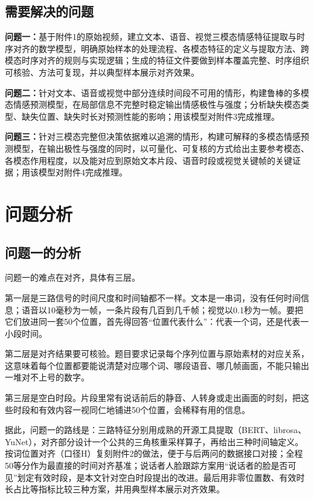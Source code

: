 \subsection{需要解决的问题}

\textbf{问题一：}基于附件1的原始视频，建立文本、语音、视觉三模态情感特征提取与时序对齐的数学模型，明确原始样本的处理流程、各模态特征的定义与提取方法、跨模态时序对齐的规则与实现逻辑；生成的特征文件要做到样本覆盖完整、时序组织可核验、方法可复现，并以典型样本展示对齐效果。

\textbf{问题二：}针对文本、语音或视觉中部分连续时间段不可用的情形，构建鲁棒的多模态情感预测模型，在局部信息不完整时稳定输出情感极性与强度；分析缺失模态类型、缺失位置、缺失时长对预测性能的影响；用该模型对附件3完成推理。

\textbf{问题三：}针对三模态完整但决策依据难以追溯的情形，构建可解释的多模态情感预测模型，在输出极性与强度的同时，以可量化、可复核的方式给出主要参考模态、各模态作用程度，以及能对应到原始文本片段、语音时段或视觉关键帧的关键证据；用该模型对附件4完成推理。

\section{问题分析}

\subsection{问题一的分析}

问题一的难点在对齐，具体有三层。

第一层是三路信号的时间尺度和时间轴都不一样。文本是一串词，没有任何时间信息；语音以10毫秒为一帧，一条片段有几百到几千帧；视觉以0.1秒为一帧。要把它们放进同一套50个位置，首先得回答“位置代表什么”：代表一个词，还是代表一小段时间。

第二层是对齐结果要可核验。题目要求记录每个序列位置与原始素材的对应关系，这意味着每个位置都要能说清楚对应哪个词、哪段语音、哪几帧画面，不能只输出一堆对不上号的数字。

第三层是空白时段。片段里常有说话前后的静音、人转身或走出画面的时刻，把这些时段和有效内容一视同仁地铺进50个位置，会稀释有用的信息。

据此，问题一的路线是：三路特征分别用成熟的开源工具提取（BERT、librosa、YuNet），对齐部分设计一个公共的三角核重采样算子，再给出三种时间轴定义。按词位置对齐（口径H）复刻附件2的做法，便于与后两问的数据接口对接；全程50等分作为最直接的时间对齐基准；说话者人脸跟踪方案用“说话者的脸是否可见”划定有效时段，是本文针对空白时段提出的改进。最后用非零位置数、有效时长占比等指标比较三种方案，并用典型样本展示对齐效果。

